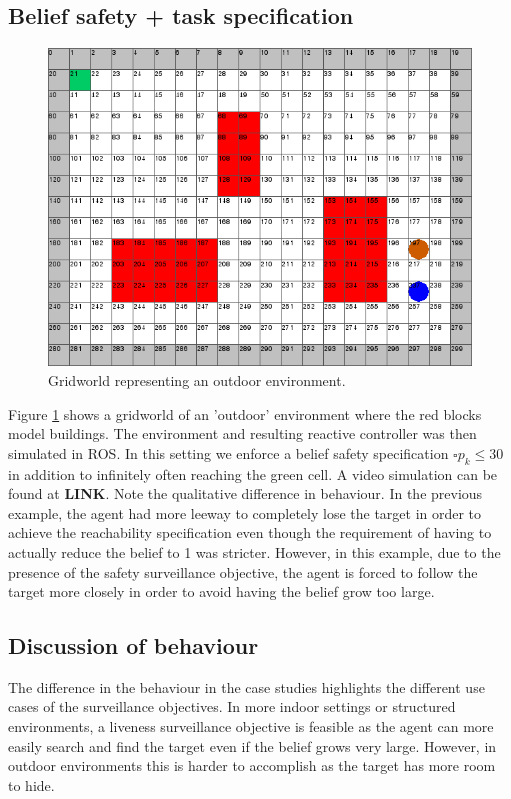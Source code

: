 \subsection{Belief safety + task specification}
\begin{figure}
\centering
\includegraphics[scale=0.3]{case2.png}\caption{Gridworld representing an outdoor environment.}\label{fig:case2}
\end{figure}
Figure \ref{fig:case2} shows a gridworld of an 'outdoor' environment where the red blocks model buildings. The environment and resulting reactive controller was then simulated in ROS.
In this setting we enforce a belief safety specification $\square p_k \leq 30$ in addition to infinitely often reaching the green cell.  A video simulation can be found at \textbf{LINK}. Note the qualitative difference in behaviour. In the previous example, the agent had more leeway to completely lose the target in order to achieve the reachability specification even though the requirement of having to actually reduce the belief to 1 was stricter. However, in this example, due to the presence of the safety surveillance objective, the agent is forced to follow the target more closely in order to avoid having the belief grow too large. 

\subsection{Discussion of behaviour}
The difference in the behaviour in the case studies highlights the different use cases of the surveillance objectives. In more indoor settings or structured environments, a liveness surveillance objective is feasible as the agent can more easily search and find the target even if the belief grows very large. However, in outdoor environments this is harder to accomplish as the target has more room to hide. 